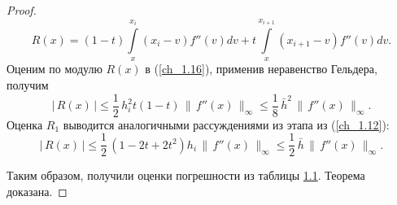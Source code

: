 ﻿\documentclass[a4paper,14pt]{extreport}
\newcommand{\RNumb}[1]{\uppercase\expandafter{\romannumeral #1\relax}}
\begin{document}
\begin{proof}
        \begin{equation}
            \label{ch_1.16}
            R(x)=(1-t) \int\limits_{x}^{x_{i}}(x_{i}-v) f''(v) dv+t \int\limits_{x}^{x_{i+1}}(x_{i+1}-v) f''(v) dv.
        \end{equation}
         Оценим по модулю $R(x)$ в (\ref{ch_1.16}), применив неравенство Гельдера, получим
         \begin{equation}
            \label{ch_1.17}
            |\,R(x)\,|\leqslant\dfrac12\,h_i^2t(1-t)\,\|\,f''(x)\,\|_\infty\leqslant\dfrac18\,\bar{h}^2\,\|\,f''(x)\,\|_\infty.
        \end{equation}
        Оценка $R_1$ выводится аналогичными рассуждениями из \RNumb{3} этапа из (\ref{ch_1.12}):
        \begin{equation}
            \label{ch_1.18}
            |\,R(x)\,|\leqslant\dfrac12\,(1-2t+2t^2)h_i\,\|\,f''(x)\,\|_\infty\leqslant\dfrac12\,\bar{h}\,\|\,f''(x)\,\|_\infty.
        \end{equation}
        \par Таким образом, получили оценки погрешности из таблицы \hyperref[table_1]{1.1}. Теорема доказана.
    \end{proof}
    
\end{document}
